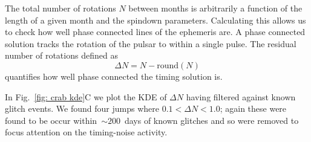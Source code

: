 \documentclass[../full_thesis/full_thesis.tex]{subfiles}
\begin{document}
The total number of rotations $N$ between months is arbitrarily a function of
the length of a given month and the spindown parameters. Calculating this
allows us to check how well phase connected lines of the ephemeris are. A phase
connected solution tracks the rotation of the pulsar to within a single pulse.
The residual number of rotations defined as
\begin{equation}
\Delta N = N - \textrm{round}(N)
\end{equation}
quantifies how well phase connected the timing solution is.

In Fig.~\ref{fig: crab kde}C we plot the KDE of $\Delta N$ having filtered
against known glitch events. We found four jumps where $0.1 < \Delta N < 1.0$;
again these were found to be occur within~$\sim200$~days of known glitches and
so were removed to focus attention on the timing-noise activity.
\end{document}

